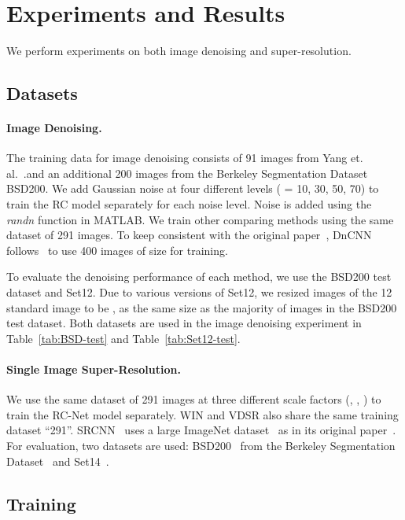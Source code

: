 \documentclass[10pt,twocolumn,letterpaper]{article}
\begin{document}
\section{Experiments and Results}
We perform experiments on both image denoising and super-resolution.

\subsection{Datasets}

\paragraph{Image Denoising.} The training data for image denoising consists of 91 images from Yang et. al.~\cite{yang2010image}.and an additional 200 images from the Berkeley Segmentation Dataset BSD200. We add Gaussian noise at four different levels ( = 10, 30, 50, 70) to train the RC model separately for each noise level. Noise is added using the \textit{randn} function in MATLAB. We train other comparing methods using the same dataset of 291 images.  To keep consistent with the original paper~\cite{zhang2016beyond}, DnCNN follows~\cite{chen2017trainable} to
use 400 images of size  for training.

To evaluate the denoising performance of each method, we use the BSD200 test dataset and Set12. Due to various versions of Set12, we resized images of the 12 standard image to be , as the same size as the majority of images in the BSD200 test dataset. Both datasets are used in the image denoising experiment in Table~\ref{tab:BSD-test} and Table~\ref{tab:Set12-test}. 

\paragraph{Single Image Super-Resolution.} We use the same dataset of 291 images at three different scale factors (, ,  ) to train the RC-Net model separately. WIN and VDSR also share the same training dataset ``291''. SRCNN~\cite{dong2014learning} uses a large ImageNet dataset~\cite{deng2009imagenet} as in its original paper~\cite{dong2014learning}. 
For evaluation, two datasets are used: BSD200~\cite{MartinFTM01} from the Berkeley Segmentation Dataset~\cite{MartinFTM01} and Set14~\cite{zeyde2010single}. 


\subsection{Training}
\end{document}
